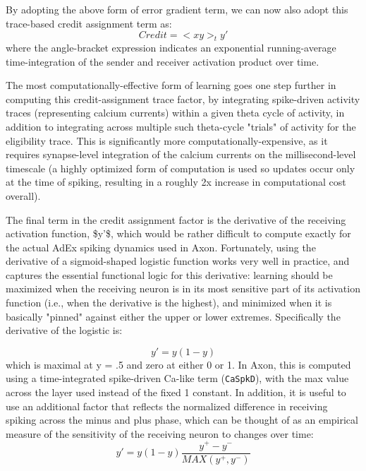 \documentclass[11pt,twoside]{article}
\newif\myifpdf
\begin{document}
By adopting the above form of error gradient term, we can now also adopt this trace-based credit assignment term as:
\begin{equation}
Credit = < x y >_t y'
\end{equation}
where the angle-bracket expression indicates an exponential running-average time-integration of the sender and receiver activation product over time.

The most computationally-effective form of learning goes one step further in computing this credit-assignment trace factor, by integrating spike-driven activity traces (representing calcium currents) within a given theta cycle of activity, in addition to integrating across multiple such theta-cycle "trials" of activity for the eligibility trace. This is significantly more computationally-expensive, as it requires synapse-level integration of the calcium currents on the millisecond-level timescale (a highly optimized form of computation is used so updates occur only at the time of spiking, resulting in a roughly 2x increase in computational cost overall).

The final term in the credit assignment factor is the derivative of the receiving activation function, \$y'\$, which would be rather difficult to compute exactly for the actual AdEx spiking dynamics used in Axon. Fortunately, using the derivative of a sigmoid-shaped logistic function works very well in practice, and captures the essential functional logic for this derivative: learning should be maximized when the receiving neuron is in its most sensitive part of its activation function (i.e., when the derivative is the highest), and minimized when it is basically "pinned" against either the upper or lower extremes. Specifically the derivative of the logistic is:

\begin{equation}
y' = y (1-y)
\end{equation}
which is maximal at y = .5 and zero at either 0 or 1. In Axon, this is computed using a time-integrated spike-driven Ca-like term (\texttt{CaSpkD}), with the max value across the layer used instead of the fixed 1 constant. In addition, it is useful to use an additional factor that reflects the normalized difference in receiving spiking across the minus and plus phase, which can be thought of as an empirical measure of the sensitivity of the receiving neuron to changes over time: 
\begin{equation}
y' = y (1-y) \frac{y^+ - y^-}{MAX(y^+, y^-)}
\end{equation}
\end{document}
